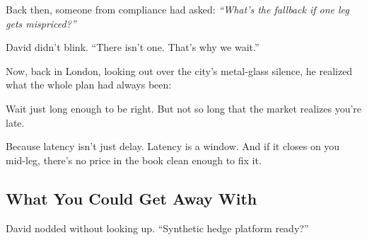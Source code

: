 Back then, someone from compliance had asked:
\textit{“What’s the fallback if one leg gets mispriced?”}

David didn’t blink.
“There isn’t one. That’s why we wait.”

Now, back in London, looking out over the city’s metal-glass silence,
he realized what the whole plan had always been:

Wait just long enough to be right.
But not so long that the market realizes you’re late.

Because latency isn’t just delay.
Latency is a window.
And if it closes on you mid-leg,
there’s no price in the book clean enough to fix it.





\subsection{What You Could Get Away With}


David nodded without looking up. “Synthetic hedge platform ready?”

\medskip

